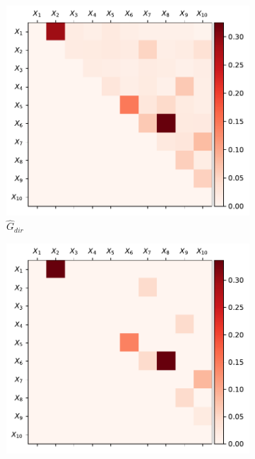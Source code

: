 \documentclass[../Thesis.tex]{subfiles}
\begin{document}
\begin{figure}[H]
    \centering
    \begin{subfigure}[t]{0.49\linewidth}
        \includegraphics[width = \linewidth]{figures/ND examples/Gaussian network 10 - G_dir - triangular.pdf}
        \caption{$\hat{G}_{dir}$}
    \end{subfigure}
    \hfill
    \begin{subfigure}[t]{0.49\linewidth}
        \includegraphics[width = \linewidth]{figures/ND examples/Gaussian network 10 - G_dir true - triangular.pdf}

\end{subfigure}
\end{figure}
\end{document}
